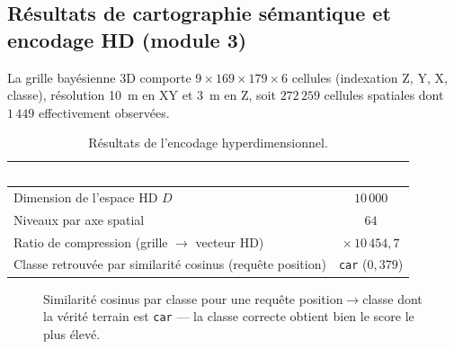 \documentclass[12pt,a4paper,titlepage]{article}
\newcommand{\hd}[1]{\textcolor{white}{\textbf{#1}}}
\begin{document}
\subsection{Résultats de cartographie sémantique et encodage HD (module 3)}
\label{subsec:res_phase4}

La grille bayésienne 3D comporte $9 \times 169 \times 179 \times 6$ cellules (indexation Z, Y, X, classe), résolution 10~m en XY et 3~m en Z, soit $272\,259$ cellules spatiales dont $1\,449$ effectivement observées.

\begin{table}[H]
    \centering
    \caption{Résultats de l'encodage hyperdimensionnel.}
    \begin{tabular}{lc}
        \toprule
        \rowcolor{tabhead}
        \hd{Indicateur} & \hd{Valeur} \\
        \midrule
        Dimension de l'espace HD $D$ & $10\,000$ \\
        Niveaux par axe spatial & $64$ \\
        Ratio de compression (grille $\to$ vecteur HD) & $\times\,10\,454{,}7$ \\
        Classe retrouvée par similarité cosinus (requête position) & \texttt{car} ($0{,}379$) \\
        \bottomrule
    \end{tabular}
\end{table}

\begin{figure}[H]
    \centering
    \caption{Similarité cosinus par classe pour une requête position$\to$classe dont la vérité terrain est \texttt{car} --- la classe correcte obtient bien le score le plus élevé.}
    \label{fig:chart_hd_query}
\end{figure}
\end{document}
